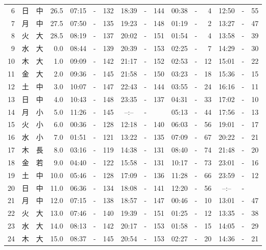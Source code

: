 \documentclass[12pt.a4j]{jsarticle}
\begin{document}
\begin{center}
\begin{table}[ht]
\begin{tabular}{|rc|cr|ccrccr|ccrccr|}
 6 & 日 & 中 & 26.5 &  07:15 &-& 132  &  18:39 &-& 144  &   00:38 &-&   4  &   12:50 &-&  55  \\
 7 & 月 & 中 & 27.5 &  07:50 &-& 135  &  19:23 &-& 148  &   01:19 &-&   2  &   13:27 &-&  47  \\
 8 & 火 & 大 & 28.5 &  08:19 &-& 137  &  20:02 &-& 151  &   01:54 &-&   4  &   13:58 &-&  39  \\
 9 & 水 & 大 &  0.0 &  08:44 &-& 139  &  20:39 &-& 153  &   02:25 &-&   7  &   14:29 &-&  30  \\
10 & 木 & 大 &  1.0 &  09:09 &-& 142  &  21:17 &-& 152  &   02:53 &-&  12  &   15:01 &-&  22  \\
11 & 金 & 大 &  2.0 &  09:36 &-& 145  &  21:58 &-& 150  &   03:23 &-&  18  &   15:36 &-&  15  \\
12 & 土 & 中 &  3.0 &  10:07 &-& 147  &  22:43 &-& 144  &   03:55 &-&  24  &   16:16 &-&  11  \\
13 & 日 & 中 &  4.0 &  10:43 &-& 148  &  23:35 &-& 137  &   04:31 &-&  33  &   17:02 &-&  10  \\
14 & 月 & 小 &  5.0 &  11:26 &-& 145  &  --:-- &-&     &   05:13 &-&  44  &   17:56 &-&  13  \\
15 & 火 & 小 &  6.0 &  00:36 &-& 128  &  12:18 &-& 140  &   06:03 &-&  56  &   19:01 &-&  17  \\
16 & 水 & 小 &  7.0 &  01:51 &-& 121  &  13:22 &-& 135  &   07:09 &-&  67  &   20:22 &-&  21  \\
17 & 木 & 長 &  8.0 &  03:16 &-& 119  &  14:38 &-& 131  &   08:40 &-&  74  &   21:48 &-&  20  \\
18 & 金 & 若 &  9.0 &  04:40 &-& 122  &  15:58 &-& 131  &   10:17 &-&  73  &   23:01 &-&  16  \\
19 & 土 & 中 & 10.0 &  05:46 &-& 128  &  17:09 &-& 136  &   11:28 &-&  66  &   23:59 &-&  12  \\
20 & 日 & 中 & 11.0 &  06:36 &-& 134  &  18:08 &-& 141  &   12:20 &-&  56  &   --:-- &-&     \\
21 & 月 & 中 & 12.0 &  07:15 &-& 138  &  18:57 &-& 147  &   00:46 &-&  10  &   13:01 &-&  47  \\
22 & 火 & 大 & 13.0 &  07:46 &-& 140  &  19:39 &-& 151  &   01:25 &-&  12  &   13:35 &-&  38  \\
23 & 水 & 大 & 14.0 &  08:13 &-& 142  &  20:17 &-& 153  &   01:58 &-&  15  &   14:05 &-&  29  \\
24 & 木 & 大 & 15.0 &  08:37 &-& 145  &  20:54 &-& 153  &   02:27 &-&  20  &   14:36 &-&  21  \\

\end{tabular}
\end{table}
\end{center}
\end{document}
